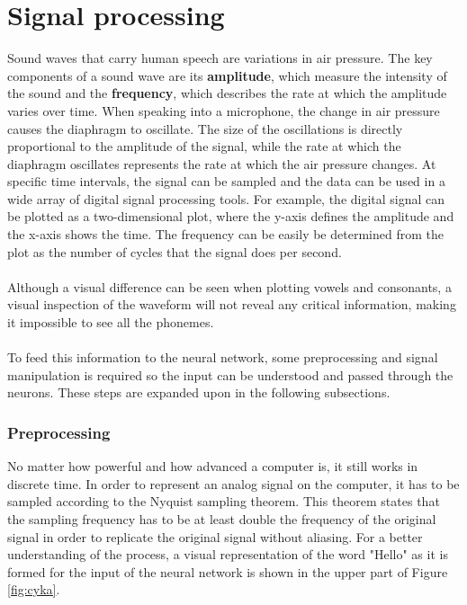 \section{Signal processing}
Sound waves that carry human speech are variations in air pressure.
The key components of a sound wave are its \textbf{amplitude},
which measure the intensity of the sound and the \textbf{frequency}, which describes the rate at which the amplitude varies over time.
When speaking into a microphone,
the change in air pressure causes the diaphragm to oscillate.
The size of the oscillations is directly proportional to the amplitude of the signal,
while the rate at which the diaphragm oscillates represents the rate at which the air pressure changes.
At specific time intervals,
the signal can be sampled and the data can be used in a wide array of digital signal processing tools.
For example, the digital signal can be plotted as a two-dimensional plot,
where the y-axis defines the amplitude and the x-axis shows the time.
The frequency can be easily be determined from the plot as the number of cycles that the signal does per second.\\\\
Although a visual difference can be seen when plotting vowels and consonants,
a visual inspection of the waveform will not reveal any critical information, making it impossible to see all the phonemes.\\\\
To feed this information to the neural network, some preprocessing and signal manipulation is required so the input can be understood and passed through the neurons.
These steps are expanded upon in the following subsections.

\subsubsection{ Preprocessing}
No matter how powerful and how advanced a computer is,
it still works in discrete time.
In order to represent an analog signal on the computer, it has to be sampled according to the Nyquist sampling theorem.
This theorem states that the sampling frequency has to be at least double the frequency of the original signal in order to replicate the original signal without aliasing.
For a better understanding of the process, a visual representation of the word "Hello" as it is formed for the input of the neural network is shown in the upper part of Figure \ref{fig:cyka}.

